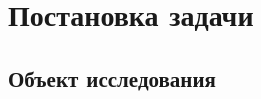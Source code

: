 \chapter{Постановка задачи} \label{chapt_problem_formulation}

\section{Объект исследования} \label{sect_problem_obj}



